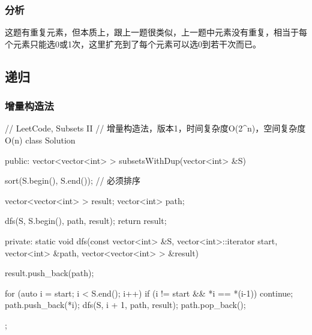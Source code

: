 \subsubsection{分析}
这题有重复元素，但本质上，跟上一题很类似，上一题中元素没有重复，相当于每个元素只能选0或1次，这里扩充到了每个元素可以选0到若干次而已。


\subsection{递归}


\subsubsection{增量构造法}
\begin{Code}
// LeetCode, Subsets II
// 增量构造法，版本1，时间复杂度O(2^n)，空间复杂度O(n)
class Solution {
public:
    vector<vector<int> > subsetsWithDup(vector<int> &S) {
        sort(S.begin(), S.end());  // 必须排序

        vector<vector<int> > result;
        vector<int> path;

        dfs(S, S.begin(), path, result);
        return result;
    }

private:
    static void dfs(const vector<int> &S, vector<int>::iterator start,
            vector<int> &path, vector<vector<int> > &result) {
        result.push_back(path);

        for (auto i = start; i < S.end(); i++) {
            if (i != start && *i == *(i-1)) continue;
            path.push_back(*i);
            dfs(S, i + 1, path, result);
            path.pop_back();
        }
    }
};
\end{Code}

